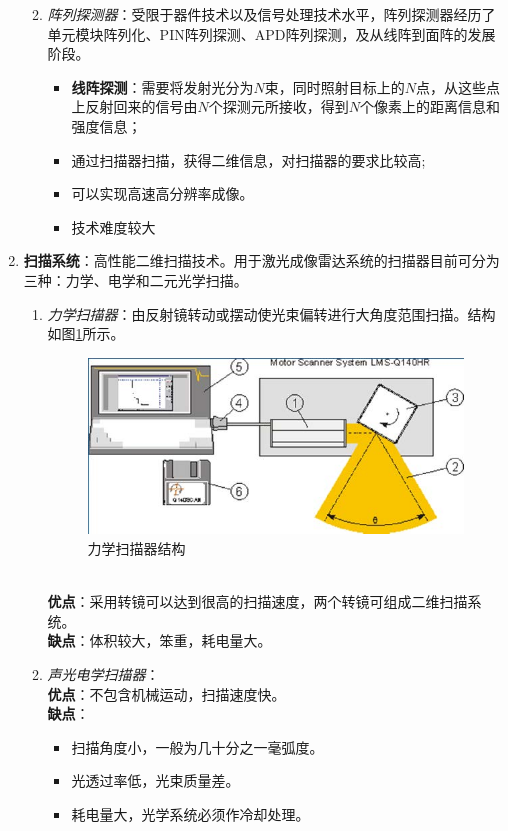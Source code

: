 \begin{enumerate}
\begin{enumerate}
\begin{itemize}
		\end{itemize}
		\item \textit{阵列探测器}：受限于器件技术以及信号处理技术水平，阵列探测器经历了单元模块阵列化、PIN阵列探测、APD阵列探测，及从线阵到面阵的发展阶段。\begin{itemize}
			\item \textbf{线阵探测}：需要将发射光分为$ N $束，同时照射目标上的$ N $点，从这些点上反射回来的信号由$ N $个探测元所接收，得到$ N $个像素上的距离信息和强度信息；
			\item 通过扫描器扫描，获得二维信息，对扫描器的要求比较高;
			\item 可以实现高速高分辨率成像。
			\item 技术难度较大
		\end{itemize}
	\end{enumerate}
	\item \textbf{扫描系统}：高性能二维扫描技术。用于激光成像雷达系统的扫描器目前可分为三种：力学、电学和二元光学扫描。
	\begin{enumerate}
		\item \textit{力学扫描器}：由反射镜转动或摆动使光束偏转进行大角度范围扫描。结构如图\ref{fig:力学扫描器结构}所示。
		\begin{figure}[htbp]
			\centering
			\includegraphics[width=0.7\linewidth]{figure/Chapter1/力学扫描器结构}
			\caption{力学扫描器结构}
			\label{fig:力学扫描器结构}
		\end{figure}\\
			\textbf{优点}：采用转镜可以达到很高的扫描速度，两个转镜可组成二维扫描系统。\\
			\textbf{缺点}：体积较大，笨重，耗电量大。
		\item \textit{声光电学扫描器}：\\
			\textbf{优点}：不包含机械运动，扫描速度快。\\
			\textbf{缺点}：\begin{itemize}
				\item 扫描角度小，一般为几十分之一毫弧度。
				\item 光透过率低，光束质量差。
				\item 耗电量大，光学系统必须作冷却处理。

\end{itemize}
\end{enumerate}
\end{enumerate}
